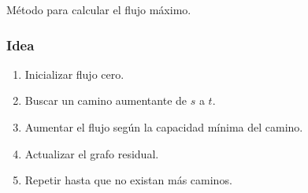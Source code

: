 \documentclass[12pt]{article}
\theoremstyle{plain}
\theoremstyle{definition}
\theoremstyle{remark}
\begin{document}
Método para calcular el flujo máximo.

\subsubsection*{Idea}

\begin{enumerate}
    \item Inicializar flujo cero.
    \item Buscar un camino aumentante de $s$ a $t$.
    \item Aumentar el flujo según la capacidad mínima del camino.
    \item Actualizar el grafo residual.
    \item Repetir hasta que no existan más caminos.
\end{enumerate}
\end{document}
